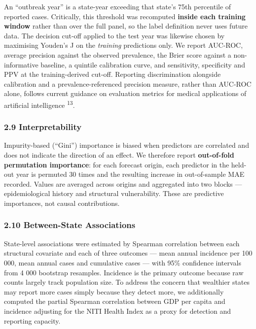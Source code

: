 \documentclass[
  10pt,
  twocolumn]{article}
\begin{document}
An ``outbreak year'' is a state-year exceeding that state's 75th
percentile of reported cases. Critically, this threshold was recomputed
\textbf{inside each training window} rather than over the full panel, so
the label definition never uses future data. The decision cut-off
applied to the test year was likewise chosen by maximising Youden's J on
the \emph{training} predictions only. We report AUC-ROC, average
precision against the observed prevalence, the Brier score against a
non-informative baseline, a quintile calibration curve, and sensitivity,
specificity and PPV at the training-derived cut-off. Reporting
discrimination alongside calibration and a prevalence-referenced
precision measure, rather than AUC-ROC alone, follows current guidance
on evaluation metrics for medical applications of artificial
intelligence \textsuperscript{13}.

\subsubsection{2.9 Interpretability}\label{interpretability}

Impurity-based (``Gini'') importance is biased when predictors are
correlated and does not indicate the direction of an effect. We
therefore report \textbf{out-of-fold permutation importance}: for each
forecast origin, each predictor in the held-out year is permuted 30
times and the resulting increase in out-of-sample MAE recorded. Values
are averaged across origins and aggregated into two blocks ---
epidemiological history and structural vulnerability. These are
predictive importances, not causal contributions.

\subsubsection{2.10 Between-State
Associations}\label{between-state-associations}

State-level associations were estimated by Spearman correlation between
each structural covariate and each of three outcomes --- mean annual
incidence per 100 000, mean annual cases and cumulative cases --- with
95\% confidence intervals from 4 000 bootstrap resamples. Incidence is
the primary outcome because raw counts largely track population size. To
address the concern that wealthier states may report more cases simply
because they detect more, we additionally computed the partial Spearman
correlation between GDP per capita and incidence adjusting for the NITI
Health Index as a proxy for detection and reporting capacity.
\end{document}
